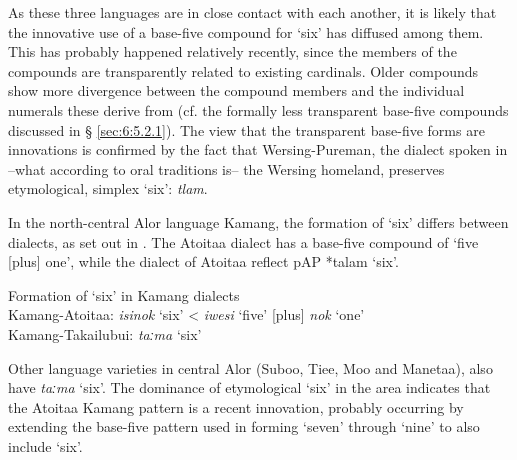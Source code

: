  

  

  

As these three languages are in close contact with each another, it is likely that the innovative  use of a base-five compound for `six' has diffused among them. This has probably happened relatively recently, since the members of the compounds are transparently related to existing cardinals. Older compounds show more divergence between the compound members and the individual numerals these derive from (cf. the formally less transparent base-five compounds discussed in {\S} \ref{sec:6:5.2.1}). The view that the transparent base-five forms are innovations is confirmed by the fact that Wersing-Pureman, the dialect spoken in --what according to oral traditions is-- the Wersing homeland, preserves etymological, simplex `six': \textit{t{\textschwa}lam}.

In the north-central Alor language Kamang, the formation of `six' differs between dialects, as set out in . The Atoitaa dialect has a base-five compound of `five [plus] one', while the dialect of Atoitaa reflect p\textsc{AP} *talam `six'. 



\ea%
\label{ex:6:5}
 \upshape Formation of `six' in Kamang dialects\\
 Kamang{}-Atoitaa: 
\textit{isi}\textit{{\ng}}\textit{nok}\textbf{} `six'     {\textless} \textit{iwesi}\textit{{\ng}} `five' [plus] \textit{nok} `one'\\
    Kamang{}-Takailubui:
    \textit{taːma} `six'      \\ 
\z





Other language varieties in central Alor (Suboo, Tiee, Moo and Manetaa), also have \textit{taːma} `six'. The dominance of etymological `six' in the area indicates that the Atoitaa Kamang pattern is a recent innovation, probably occurring by extending the base-five pattern used in forming `seven' through `nine' to also include `six'. 

